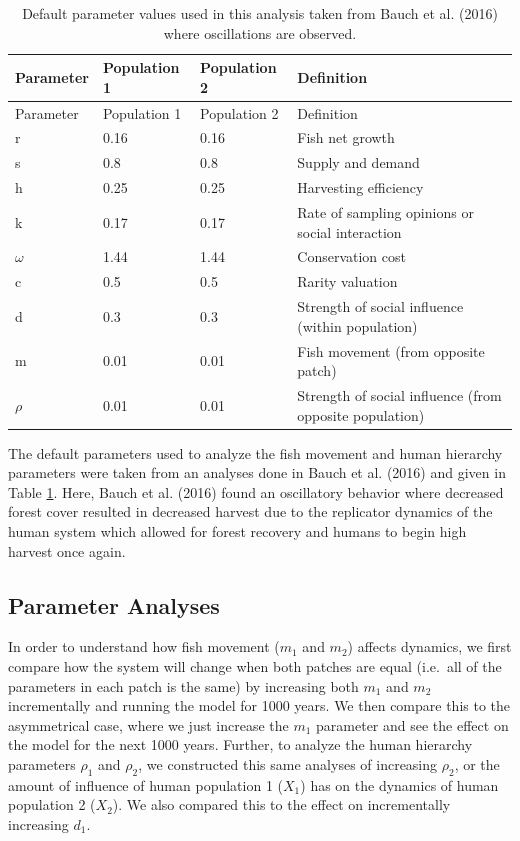 \documentclass[
  12pt,
]{article}
\begin{document}
\begin{longtable}[]{@{}llll@{}}
\caption{\label{tab:DefaultParamTable}Default parameter values used in this analysis taken from Bauch et al. (2016) where oscillations are observed. \label{DefaultParamTable}}\tabularnewline
\toprule\noalign{}
Parameter & Population 1 & Population 2 & Definition \\
\midrule\noalign{}
\endfirsthead
\toprule\noalign{}
Parameter & Population 1 & Population 2 & Definition \\
\midrule\noalign{}
\endhead
\bottomrule\noalign{}
\endlastfoot
r & 0.16 & 0.16 & Fish net growth \\
s & 0.8 & 0.8 & Supply and demand \\
h & 0.25 & 0.25 & Harvesting efficiency \\
k & 0.17 & 0.17 & Rate of sampling opinions or social interaction \\
\(\omega\) & 1.44 & 1.44 & Conservation cost \\
c & 0.5 & 0.5 & Rarity valuation \\
d & 0.3 & 0.3 & Strength of social influence (within population) \\
m & 0.01 & 0.01 & Fish movement (from opposite patch) \\
\(\rho\) & 0.01 & 0.01 & Strength of social influence (from opposite population) \\
\end{longtable}

The default parameters used to analyze the fish movement and human hierarchy parameters were taken from an analyses done in Bauch et al. (2016) and given in Table \ref{DefaultParamTable}. Here, Bauch et al. (2016) found an oscillatory behavior where decreased forest cover resulted in decreased harvest due to the replicator dynamics of the human system which allowed for forest recovery and humans to begin high harvest once again.

\subsection{Parameter Analyses}\label{parameter-analyses}

In order to understand how fish movement (\(m_1\) and \(m_2\)) affects dynamics, we first compare how the system will change when both patches are equal (i.e.~all of the parameters in each patch is the same) by increasing both \(m_1\) and \(m_2\) incrementally and running the model for 1000 years. We then compare this to the asymmetrical case, where we just increase the \(m_1\) parameter and see the effect on the model for the next 1000 years. Further, to analyze the human hierarchy parameters \(\rho_1\) and \(\rho_2\), we constructed this same analyses of increasing \(\rho_2\), or the amount of influence of human population 1 (\(X_1\)) has on the dynamics of human population 2 (\(X_2\)). We also compared this to the effect on incrementally increasing \(d_1\).
\end{document}

